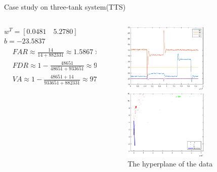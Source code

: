 \documentclass[10pt]{beamer}
\begin{document}
\begin{frame}{Case study on three-tank system(TTS)}
    \begin{columns}
             \begin{column}{0.5\textwidth}
        $w^T = [0.0481 \quad 5.2780]$ $b = -23.5837$
    \begin{equation} \nonumber
  \begin{aligned}
   & FAR \approx \frac{14}{14+882331} \approx 1.5867\times 10^{-3} \% \\
   & FDR \approx 1 - \frac{48651}{48651+933651} \approx 95.05 \% \\
   & VA \approx 1 - \frac{48651+14}{933651+882331} \approx 97.32 \% 
  \end{aligned}
\end{equation}
           \end{column}
        \begin{column}{0.5\textwidth}  %
   \begin{figure}
        \centering
        \includegraphics[width=4cm]{fig/realori.eps}
        \caption{real data from TTS}
        \includegraphics[width=4cm]{fig/realdata.eps}
        \caption{The hyperplane of the data}
        \end{figure}
  
        \end{column}
    \end{columns}
\end{frame}
\end{document}
